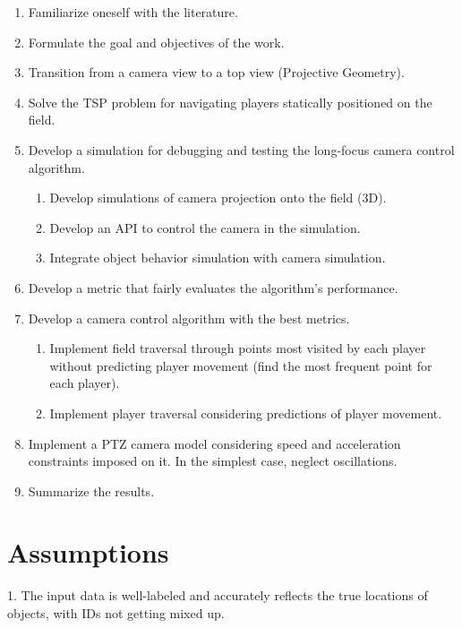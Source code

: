 \begin{enumerate}
    \item Familiarize oneself with the literature.
    \item Formulate the goal and objectives of the work.
    \item Transition from a camera view to a top view (Projective Geometry).
    \item Solve the TSP problem for navigating players statically positioned on the field.
    \item Develop a simulation for debugging and testing the long-focus camera control algorithm.
    \begin{enumerate}
        \item Develop simulations of camera projection onto the field (3D).
        \item Develop an API to control the camera in the simulation.
        \item Integrate object behavior simulation with camera simulation.
    \end{enumerate}
    \item Develop a metric that fairly evaluates the algorithm's performance.
    \item Develop a camera control algorithm with the best metrics.
    \begin{enumerate}
        \item Implement field traversal through points most visited by each player without predicting player movement (find the most frequent point for each player).
        \item Implement player traversal considering predictions of player movement.
    \end{enumerate}
    \item Implement a PTZ camera model considering speed and acceleration constraints imposed on it. In the simplest case, neglect oscillations.
    \item Summarize the results.
\end{enumerate}

\section{Assumptions}

1. The input data is well-labeled and accurately reflects the true locations of objects, with IDs not getting mixed up.

